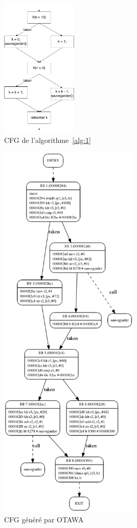 \documentclass[french]{article}
\begin{document}
  \begin{figure}
    \centering
    \includegraphics[height=250px]{pictures/cfg.png} %
    \caption{CFG de l'algorithme~\ref{alg:1}}
    \label{cfg}
  \end{figure}

  \begin{figure}
    \centering
    \includegraphics[height=525pt]{pictures/cfg_genere.png}
    \caption{CFG généré par OTAWA}
    \label{cfg_genere}
  \end{figure}
\end{document}
